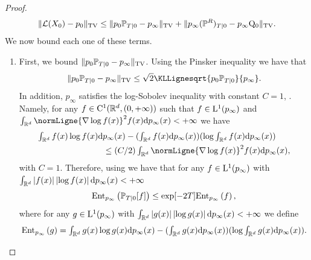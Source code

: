 \begin{proof}
    \begin{equation}
      \| \mathcal{L}(X_0) - p_0 \|_{\mathrm{TV}} \leq \| p_0 \mathbb{P}_{T|0}- p_{\infty} \|_{\mathrm{TV}} +\| p_{\infty} (\mathbb{P}^R)_{T|0} - p_{\infty} \mathrm{Q}_0 \|_{\mathrm{TV}}  .
    \end{equation}
    We now bound each one of these terms.
    \begin{enumerate}[wide, labelwidth=!, labelindent=0pt, label=(\alph*)]
    \item First, we bound $\| p_0 \mathbb{P}_{T|0}- p_{\infty} \|_{\mathrm{TV}}$. Using the 
      Pinsker inequality \cite[Equation 5.2.2]{bakry:gentil:ledoux:2014} we have
      that
      \begin{equation}
        \label{eq:pinsker}
        \tvnormLigne{p_0 \Pbb_{T|0}- p_{\infty}} \leq \sqrt{2} \KLLignesqrt{p_0 \Pbb_{T|0}}{p_{\infty}}  . 
      \end{equation}
      In addition, $p_\infty$ satisfies the log-Sobolev inequality with
      constant $C=1$, \cite{gross1975logarithmic}. Namely, for any
      $f \in \mathrm{C}^1(\mathbb{R}^d, \left(0,+\infty\right))$ such that
      $f \in \mathrm{L}^1(p_\infty)$ and
      $\int_{\rset^d} \normLigne{\nabla \log f(x)}^2 f(x) \rmd p_\infty(x) <
      +\infty$ we have
      \begin{align}
        &\textstyle{
          \int_{\rset^d} f(x) \log f(x) \rmd p_{\infty}(x) - (\int_{\rset^d} f(x) \rmd p_{\infty}(x)) (\log \int_{\rset^d} f(x) \rmd p_{\infty}(x)) } \\
        & \qquad \qquad \qquad \qquad  \textstyle{\leq (C/2) \int_{\rset^d}  \normLigne{\nabla \log f(x)}^2 f(x) \rmd p_\infty(x)  ,          
          }
      \end{align}
      with $C=1$. Therefore, using \cite[Theorem
      5.2.1]{bakry:gentil:ledoux:2014} we have that for any
      $f \in \mathrm{L}^1(p_\infty)$ with
      $\int_{\mathbb{R}^d} \left\vert f(x) \right\vert \left\vert \log f(x) \right\vert \mathrm{d} p_\infty(x) < +\infty$      
      \begin{equation}
        \label{eq:entropy_decay}
        \mathrm{Ent}_{p_\infty}\left(\mathbb{P}_{T|0}[f]\right) \leq \exp[-2T]  \mathrm{Ent}_{p_\infty}\left(f\right)  ,
      \end{equation}
      where for any $g \in \mathrm{L}^1(p_\infty)$ with 
      $\int_{\mathbb{R}^d} \left\vert g(x) \right\vert \left\vert \log g(x) \right\vert \mathrm{d} p_\infty(x) < +\infty$ we define
      \begin{equation}
        \textstyle{
          \mathrm{Ent}_{p_\infty}\left(g\right) = \int_{\mathbb{R}^d} g(x) \log g(x) \mathrm{d}p_{\infty}(x) - (\int_{\mathbb{R}^d} g(x) \mathrm{d}p_{\infty}(x)) (\log \int_{\mathbb{R}^d} g(x) \mathrm{d}p_{\infty}(x)) .
          }
        \end{equation}

\end{enumerate}
\end{proof}
